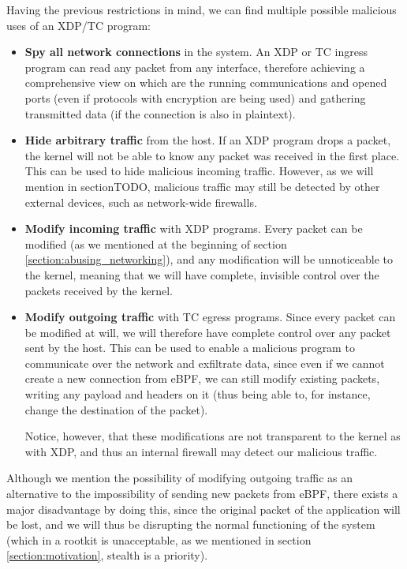 Having the previous restrictions in mind, we can find multiple possible malicious uses of an XDP/TC program:
\begin{itemize}
\item \textbf{Spy all network connections} in the system. An XDP or TC ingress program can read any packet from any interface, therefore achieving a comprehensive view on which are the running communications and opened ports (even if protocols with encryption are being used) and gathering transmitted data (if the connection is also in plaintext).
\item \textbf{Hide arbitrary traffic} from the host. If an XDP program drops a packet, the kernel will not be able to know any packet was received in the first place. This can be used to hide malicious incoming traffic. However, as we will mention in section{TODO}, malicious traffic may still be detected by other external devices, such as network-wide firewalls.
\item \textbf{Modify incoming traffic} with XDP programs. Every packet can be modified (as we mentioned at the beginning of section \ref{section:abusing_networking}), and any modification will be unnoticeable to the kernel, meaning that we will have complete, invisible control over the packets received by the kernel.
\item \textbf{Modify outgoing traffic} with TC egress programs. Since every packet can be modified at will, we will therefore have complete control over any packet sent by the host. This can be used to enable a malicious program to communicate over the network and exfiltrate data, since even if we cannot create a new connection from eBPF, we can still modify existing packets, writing any payload and headers on it (thus being able to, for instance, change the destination of the packet).

Notice, however, that these modifications are not transparent to the kernel as with XDP, and thus an internal firewall may detect our malicious traffic.
\end{itemize}

Although we mention the possibility of modifying outgoing traffic as an alternative to the impossibility of sending new packets from eBPF, there exists a major disadvantage by doing this, since the original packet of the application will be lost, and we will thus be disrupting the normal functioning of the system (which in a rootkit is unacceptable, as we mentioned in section \ref{section:motivation}, stealth is a priority).

